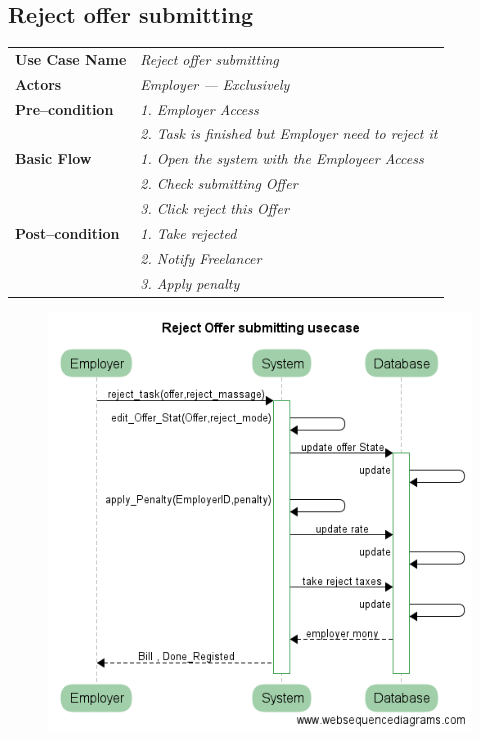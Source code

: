 \documentclass{article}
\begin{document}
\subsection{Reject offer submitting }
    \begin{tabular}{ l | l }
    \toprule
      \rowcolor{LightCyan}
      \textbf{Use Case Name}    & \textit{Reject offer submitting}\\
      \textbf{Actors}           & \textit{Employer --- Exclusively}\\
      \rowcolor{LightCyan}
      \textbf{Pre--condition}   & \textit{1. Employer Access}\\
	    			& \textit{2. Task is finished but Employer need to reject it}\\
      \textbf{Basic Flow}       & \textit{1. Open the system with the Employeer Access}\\
                                & \textit{2. Check submitting Offer}\\
                                & \textit{3. Click reject this Offer}\\
      \rowcolor{LightCyan}
      \textbf{Post--condition}  & \textit{1. Take rejected}\\
	    			& \textit{2. Notify Freelancer}\\
				& \textit{3. Apply penalty}\\
    \toprule
    \end{tabular}

\begin{figure}[ht!]
\centering
\includegraphics[width=128mm]{Reject_offer_submitting_usecase.png}
\end{figure}
\newpage
\end{document}
